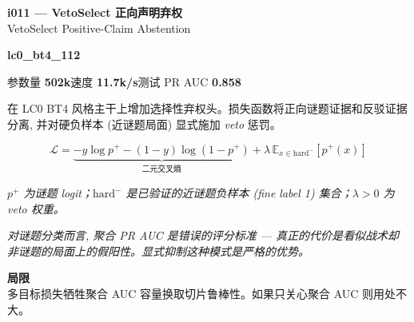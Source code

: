 \documentclass[10pt,a4paper]{article}
\newcommand{\pilllc}[0]{\colorbox{lc0bluebg}{\strut\textcolor{lc0blue}{\scriptsize\bfseries\sffamily lc0\_bt4\_112}}}
\begin{document}
\begin{tcolorbox}
\begin{tcolorbox}[archhead, boxsep=0pt, top=4pt, bottom=4pt]
\textcolor{deepforest}{\sffamily\bfseries\large i011 --- VetoSelect 正向声明弃权} \\[2pt]
{\color{muted}\small VetoSelect Positive-Claim Abstention}
\\[1pt]\textcolor{muted}{\sffamily\scriptsize \pilllc{}\quad 参数量 \textbf{502k}\quad 速度 \textbf{11.7k/s}\quad 测试 PR AUC \textbf{0.858}}
\end{tcolorbox}
\smallskip
在 LC0 BT4 风格主干上增加选择性弃权头。损失函数将正向谜题证据和反驳证据分离, 并对硬负样本 (近谜题局面) 显式施加 \emph{veto} 惩罚。
\par\smallskip
\begin{equation*}
\mathcal{L} = \underbrace{-y\log p^+ - (1-y)\log(1-p^+)}_{\text{二元交叉熵}} + \lambda\,\mathbb{E}_{x\in\mathrm{hard}^-}[p^+(x)]
\end{equation*}
\par\vspace{-4pt}\begin{center}\textit{\textcolor{muted}{\small $p^+$ 为谜题 logit；$\mathrm{hard}^-$ 是已验证的近谜题负样本 (fine label 1) 集合；$\lambda > 0$ 为 veto 权重。}}\end{center}
\par\smallskip{\color{forest}\sffamily\bfseries\textgreater\,}\textit{对谜题分类而言, 聚合 PR AUC 是错误的评分标准 --- 真正的代价是\textit{看似战术却非谜题}的局面上的假阳性。显式抑制这种模式是严格的优势。}
\par\smallskip\textbf{\sffamily\footnotesize\color{muted}局限}\\
多目标损失牺牲聚合 AUC 容量换取切片鲁棒性。如果只关心聚合 AUC 则用处不大。
\end{tcolorbox}
\end{document}
